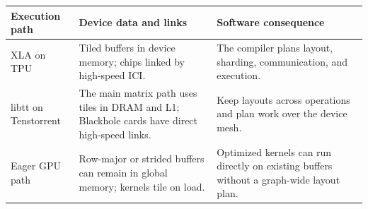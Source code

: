 \documentclass[
  10pt,
  american,
  10pt,
  letterpaper]{article}
\begin{document}
\begin{longtable}[]{@{}lll@{}}
\toprule
\begin{minipage}[b]{0.30\columnwidth}\raggedright
Execution path\strut
\end{minipage} & \begin{minipage}[b]{0.30\columnwidth}\raggedright
Device data and links\strut
\end{minipage} & \begin{minipage}[b]{0.30\columnwidth}\raggedright
Software consequence\strut
\end{minipage}\tabularnewline
\midrule
\endhead
\begin{minipage}[t]{0.30\columnwidth}\raggedright
XLA on TPU\strut
\end{minipage} & \begin{minipage}[t]{0.30\columnwidth}\raggedright
Tiled buffers in device memory; chips linked by high-speed ICI.\strut
\end{minipage} & \begin{minipage}[t]{0.30\columnwidth}\raggedright
The compiler plans layout, sharding, communication, and execution.\strut
\end{minipage}\tabularnewline
\begin{minipage}[t]{0.30\columnwidth}\raggedright
libtt on Tenstorrent\strut
\end{minipage} & \begin{minipage}[t]{0.30\columnwidth}\raggedright
The main matrix path uses tiles in DRAM and L1; Blackhole cards have
direct high-speed links.\strut
\end{minipage} & \begin{minipage}[t]{0.30\columnwidth}\raggedright
Keep layouts across operations and plan work over the device mesh.\strut
\end{minipage}\tabularnewline
\begin{minipage}[t]{0.30\columnwidth}\raggedright
Eager GPU path\strut
\end{minipage} & \begin{minipage}[t]{0.30\columnwidth}\raggedright
Row-major or strided buffers can remain in global memory; kernels tile
on load.\strut
\end{minipage} & \begin{minipage}[t]{0.30\columnwidth}\raggedright
Optimized kernels can run directly on existing buffers without a
graph-wide layout plan.\strut
\end{minipage}\tabularnewline
\bottomrule
\end{longtable}
\end{document}
